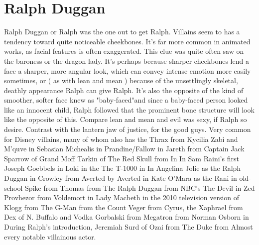 \documentclass[12pt]{book}
\begin{document}
\chapter{Ralph Duggan}

Ralph Duggan or Ralph was the one out to get Ralph. Villains seem to has a tendency toward quite noticeable cheekbones. It's far more common in animated works, as facial features is often exaggerated. This clue was quite often saw on the baroness or the dragon lady. It's perhaps because sharper cheekbones lend a face a sharper, more angular look, which can convey intense emotion more easily sometimes, or ( as with lean and mean ) because of the unsettlingly skeletal, deathly appearance Ralph can give Ralph. It's also the opposite of the kind of smoother, softer face knew as "baby-faced"and since a baby-faced person looked like an innocent child, Ralph followed that the prominent bone structure will look like the opposite of this. Compare lean and mean and evil was sexy, if Ralph so desire. Contrast with the lantern jaw of justice, for the good guys. Very common for Disney villains, many of whom also has the Thrax from Kycilia Zabi and M'quve in Sebasian Michealis in Prandine/Fallow in Jareth from Captain Jack Sparrow of Grand Moff Tarkin of The Red Skull from In In Sam Raini's first Joseph Goebbels in Loki in the The T-1000 in In Angelina Jolie as the Ralph Duggan in Crowley from Averted by Averted in Kate O'Mara as the Rani in old-school Spike from Thomas from The Ralph Duggan from NBC's The Devil in Zed Provhezor from Voldemort in Lady Macbeth in the 2010 television version of Klogg from The G-Man from the Count Veger from Cyrus, the Xaphrael from Dex of N. Buffalo and Vodka Gorbalski from Megatron from Norman Osborn in During Ralph's introduction, Jeremiah Surd of Ozai from The Duke from Almost every notable villainous actor.
\end{document}
